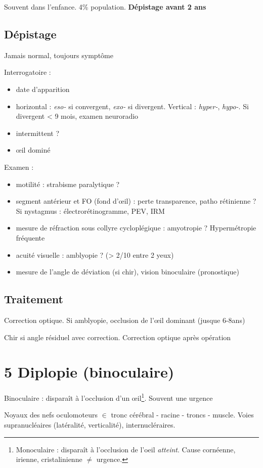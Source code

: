 \documentclass[11pt]{article}
\begin{document}
Souvent dans l'enfance. 4\% population. \textbf{Dépistage avant 2 ans}

\subsection{Dépistage}
\label{sec:org144ddd9}
Jamais normal, toujours symptôme

Interrogatoire :
\begin{itemize}
\item date d'apparition
\item horizontal : \emph{eso-} si convergent, \emph{exo-} si divergent. Vertical : \emph{hyper-},
\emph{hypo-}. Si divergent < 9 mois, examen neuroradio
\item intermittent ?
\item \oe{}il dominé
\end{itemize}

Examen : 
\begin{itemize}
\item motilité : strabisme paralytique ?
\item segment antérieur et FO (fond d'\oe{}il) : perte transparence, patho rétinienne ? Si nystagmus : électrorétinogramme, PEV, IRM
\item mesure de réfraction sous collyre cycloplégique : amyotropie ? Hypermétropie fréquente
\item acuité visuelle : amblyopie ? (> 2/10 entre 2 yeux)
\item mesure de l'angle de déviation (si chir), vision binoculaire (pronostique)
\end{itemize}

\subsection{Traitement}
\label{sec:org3fe45af}
Correction optique. Si amblyopie, occlusion de l'\oe{}il dominant (jusque 6-8ans)

Chir si angle résiduel avec correction. Correction optique après opération
\section{5 Diplopie (binoculaire)}
\label{sec:org27b125a}
Binoculaire : disparaît à l'occlusion d'un \oe{}il\footnote{Monoculaire : disparaît à l'occlusion de l'oeil \emph{atteint}. Cause cornéenne, irienne, cristalinienne \(\ne\) urgence.}. Souvent une urgence
\danger

Noyaux des nefs oculomoteurs \(\in\) tronc cérébral - racine - troncs -
muscle. Voies supranucléaires (latéralité, verticalité), internucléraires.
\end{document}

